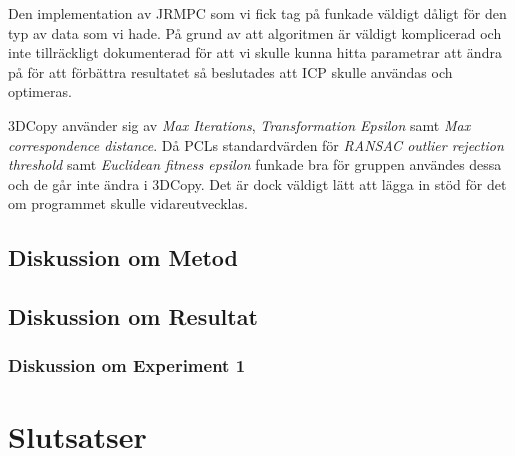 Den implementation av JRMPC som vi fick tag på funkade väldigt dåligt för den typ av data som vi hade. På grund av att algoritmen är väldigt komplicerad och inte tillräckligt dokumenterad för att vi skulle kunna hitta parametrar att ändra på för att förbättra resultatet så beslutades att ICP skulle användas och optimeras.

3DCopy använder sig av \textit{Max Iterations}, \textit{Transformation Epsilon} samt \textit{Max correspondence distance}. Då PCLs standardvärden för \textit{RANSAC outlier rejection threshold} samt \textit{Euclidean fitness epsilon} funkade bra för gruppen användes dessa och de går inte ändra i 3DCopy. Det är dock väldigt lätt att lägga in stöd för det om programmet skulle vidareutvecklas.

\subsection{Diskussion om Metod}



\subsection{Diskussion om Resultat}

\subsubsection{Diskussion om Experiment 1}



\section{Slutsatser}
\label{sec:conclusions-karlsson}


